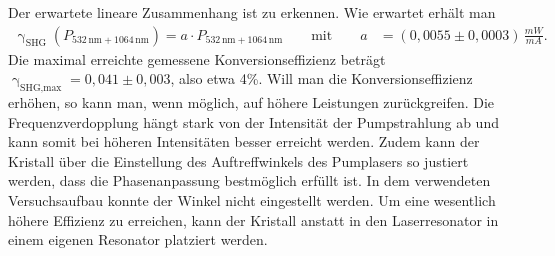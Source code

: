 \documentclass[twoside,colorback,accentcolor=tud4c,11pt]{tudreport}
\begin{document}
Der erwartete lineare Zusammenhang ist zu erkennen. Wie erwartet erhält man 
\begin{align*}
\upgamma_{\text{SHG}}(P_{532\,\text{nm}+1064\,\text{nm}})=a\cdot P_{532\,\text{nm}+1064\,\text{nm}} \qquad \text{mit} \qquad
a&=(0,0055\pm0,0003)\,\frac{\si{mW}}{\si{mA}}.
\end{align*}
Die maximal erreichte gemessene Konversionseffizienz beträgt $\upgamma_{\text{SHG,max}}=0,041\pm0,003$, also etwa 4\%. Will man die Konversionseffizienz erhöhen, so kann man, wenn möglich, auf höhere Leistungen zurückgreifen. Die Frequenzverdopplung hängt stark von der Intensität der Pumpstrahlung ab und kann somit bei höheren Intensitäten besser erreicht werden. Zudem kann der Kristall über die Einstellung des Auftreffwinkels des Pumplasers so justiert werden, dass die Phasenanpassung bestmöglich erfüllt ist. In dem verwendeten Versuchsaufbau konnte der Winkel nicht eingestellt werden. Um eine wesentlich höhere Effizienz zu erreichen, kann der Kristall anstatt in den Laserresonator in einem eigenen Resonator platziert werden.
\end{document}
